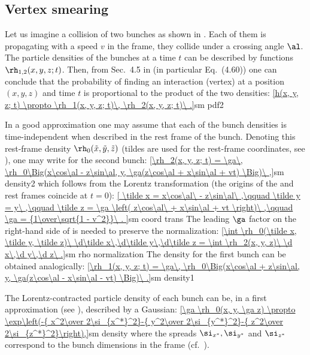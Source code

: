\subsection{Vertex smearing}


Let us imagine a collision of two bunches as shown in . Each of them is propagating with a speed $v$ in the  frame, they collide under a crossing angle $\al$. The particle densities of the bunches at a time $t$ can be described by functions $\rh_{1, 2}(x, y, z; t)$. Then, from Sec.~4.5 in  (in particular Eq.~(4.60)) one can conclude that the probability of finding an interaction (vertex) at a position $(x, y, z)$ and time $t$ is proportional to the product of the two densities:
\eqref{h(x, y, z; t) \propto \rh_1(x, y, z; t)\, \rh_2(x, y, z; t)\ .}{sm pdf2}

In a good approximation one may assume that each of the bunch densities is time-independent when described in the rest frame of the bunch. Denoting this rest-frame density $\rh_0(\tilde x, \tilde y, \tilde z)$ (tildes are used for the rest-frame coordinates, see ), one may write for the second bunch:
\eqref{\rh_2(x, y, z; t) = \ga\, \rh_0\Big(x\cos\al - z\sin\al, y, \ga(z\cos\al + x\sin\al + vt) \Big)\ ,}{sm density2}
which follows from the Lorentz transformation (the origins of the  and rest frames coincide at $t=0$):
\eqref{
	\tilde x = x\cos\al\ - z\sin\al\ ,\qquad
	\tilde y = y\ ,\qquad
	\tilde z = \ga \left( z\cos\al\ + x\sin\al + vt \right)\ ,\qquad
	\ga = {1\over\sqrt{1 - v^2}}\ .
}{sm coord trans}
The leading $\ga$ factor on the right-hand side of  is needed to preserve the normalization:
\eqref{\int \rh_0(\tilde x, \tilde y, \tilde z)\ \d\tilde x\,\d\tilde y\,\d\tilde z = \int \rh_2(x, y, z)\ \d x\,\d y\,\d z\ .}{sm rho normalization}
The density for the first bunch can be obtained analogically:
\eqref{\rh_1(x, y, z; t) = \ga\, \rh_0\Big(x\cos\al + z\sin\al, y, \ga(z\cos\al - x\sin\al - vt) \Big)\ .}{sm density1}

The Lorentz-contracted particle density of each bunch can be, in a first approximation (see ), described by a Gaussian:
\eqref{\ga \rh_0(x, y, \ga z) \propto \exp\left(-{ x^2\over 2\si_{x^*}^2}-{ y^2\over 2\si_{y^*}^2}-{ z^2\over 2\si_{z^*}^2}\right),}{sm density}
where the spreads $\si_{x^*}, \si_{y^*}$ and $\si_{z^*}$ correspond to the bunch dimensions in the  frame (cf.~).

